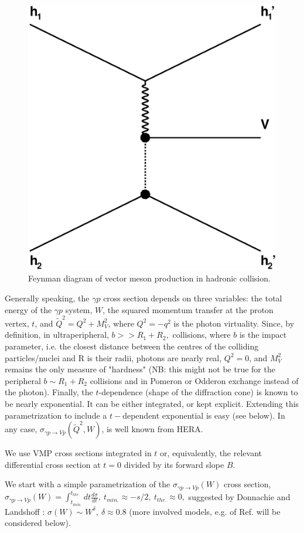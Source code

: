 \documentclass[12pt]{article}
\begin{document}
\begin{figure}[!h]
\centering
 \includegraphics[width=.4\textwidth]{figures/exclusive_vmp.eps}
 \caption{Feynman diagram of vector meson production in hadronic collision.}
 \label{fig:vmp_feynman}
\end{figure}

Generally speaking, the $\gamma p$ cross section depends on three variables: the total energy of the $\gamma p$ system, $W$,
the squared momentum transfer at the proton vertex, $t$, and $\tilde Q^2=Q^2+M_V^2$, where $Q^2=-q^2$ is the photon virtuality. Since, by definition, in ultraperipheral, $b>>R_1+R_2,$
collisions, where $b$ is the impact parameter, i.e. the closest distance between the centres of the colliding particles/nuclei and R is their radii,
photons are nearly real, $Q^2=0$, and $M_V^2$ remains the only measure of "hardness" (NB: this might not be true for the peripheral $b\sim R_1+R_2$ collisions and in
Pomeron or Odderon exchange instead of the photon). Finally, the $t$-dependence (shape of the diffraction cone) is known to be nearly exponential. It can be either integrated, or
kept explicit. Extending this parametrization to include a $t-$dependent exponential is easy (see below).
In any case, $\sigma_{\gamma p\rightarrow Vp}(\tilde Q^2, W)$, is well known from HERA.

We use VMP cross sections integrated in $t$ or, equivalently, the relevant differential cross section
at $t=0$ divided by its forward slope $B$.


We start with a simple parametrization of the $\sigma_{\gamma p\rightarrow Vp}(W)$ cross section, $\sigma_{\gamma p\rightarrow Vp}(W)=\int_{t_{min.}}^{t_{thr.}}dt\frac{d\sigma}{dt},\ t_{min.}\approx -s/2,\ 
t_{thr.}\approx 0,$
suggested by Donnachie and Landshoff \cite{DL}: $\sigma(W)\sim W^{\delta},\ \delta\approx 0.8$ (more involved models, e.g. of Ref. \cite{FFJS, Capua} will be considered below).
\end{document}

